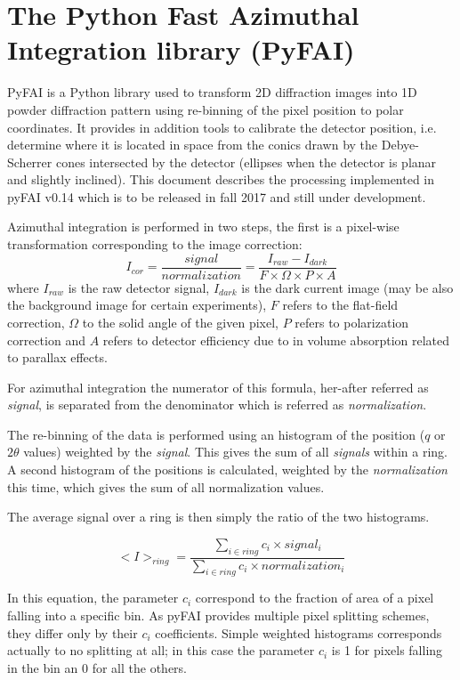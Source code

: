 \documentclass[preprint, pdf]{iucr}              %
\begin{document}
\section{The Python Fast Azimuthal Integration library (PyFAI)}

PyFAI is a Python \cite{python} library used to transform 2D diffraction images into
1D powder diffraction pattern using re-binning of the pixel position to polar coordinates.
It provides in addition tools to calibrate the detector position, i.e. determine
where it is located in space from the conics drawn by the Debye-Scherrer cones
intersected by the detector (ellipses when the detector is planar and slightly
inclined). This document describes the processing implemented in pyFAI
v0.14 which is to be released in fall 2017 and still under development.

Azimuthal integration is performed in two steps, the first is a pixel-wise
transformation corresponding to the image correction:
$$
I_{cor} = \frac{signal}{normalization}  = \frac{I_{raw} - I_{dark}}{F \times
\Omega \times P \times A } $$
where $I_{raw}$ is the raw detector signal, $I_{dark}$ is the dark current
image (may be also the background image for certain experiments), $F$ refers to
the flat-field correction, $\Omega$ to the solid angle of the given pixel, $P$
refers to polarization correction and $A$ refers to detector efficiency due
to in volume absorption related to parallax effects.

For azimuthal integration the numerator of this formula, her-after referred as
\textit{signal}, is separated from the denominator which is referred as
\textit{normalization}.

The re-binning of the data is performed using an histogram of the position ($q$
or $2\theta$ values) weighted by the \textit{signal}.
This gives the sum of all \textit{signals} within a ring.
A second histogram of the positions is calculated, weighted by the
\textit{normalization} this time, which gives the sum of all normalization
values.

The average signal over a ring is then simply the ratio of the two histograms.

$$
<I>_{ring} = \frac{\sum\limits_{i \in ring} c_i \times signal_i}
                  {\sum\limits_{i \in ring} c_i \times normalization_i}
$$

In this equation, the parameter $c_i$ correspond to the fraction of area of a
pixel falling into a specific bin.
As pyFAI provides multiple pixel splitting schemes, they differ only by their
$c_i$ coefficients.
Simple weighted histograms corresponds actually to no splitting at all; in this
case the parameter $c_i$ is 1 for pixels falling in the bin an 0 for all the
others.
\end{document}

